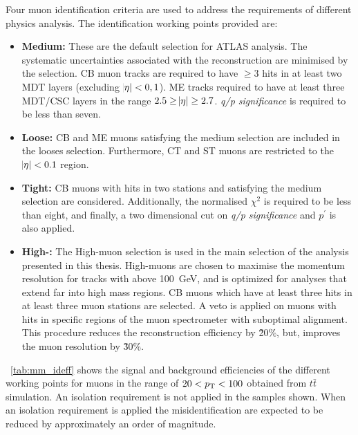 Four muon identification criteria are used to address the requirements of different physics analysis. The identification working points provided are: 
\begin{itemize}
    \item \textbf{Medium:} These are the default selection for ATLAS analysis. The systematic uncertainties associated with the reconstruction are minimised by the selection. CB muon tracks are required to have $\geq 3$ hits in at least two MDT layers (excluding $\abs{\eta} < 0,1$). ME tracks required to have at least three MDT/CSC layers in the range $2.5 \geq \abs{\eta} \geq 2.7$. \emph{q/p significance} is required to be less than seven.
    \item \textbf{Loose:} CB and ME muons satisfying the medium selection are included in the looses selection. Furthermore, CT and ST muons are restricted to the $\abs{\eta} < 0.1$ region. 
    \item \textbf{Tight:} CB muons with hits in two stations and satisfying the medium selection are considered. Additionally, the normalised $\chi^2$ is required to be less than eight, and finally, a two dimensional cut on \emph{q/p significance} and \emph{$p^\prime$} is also applied. 
    \item \textbf{High-\pt:} The High-\pt muon selection is used in the main selection of the analysis presented in this thesis. High-\pt muons are chosen to maximise the momentum resolution for tracks with \pt above \SI{100}{\giga\electronvolt}, and is optimized for analyses that extend far into high mass regions. CB muons which have at least three hits in at least three muon stations are selected. A veto is applied on muons with hits in specific regions of the muon spectrometer with suboptimal alignment. This procedure reduces the reconstruction efficiency by \~20\%, but, improves the muon \pt resolution by \~30\%.
\end{itemize}

~\cref{tab:mm_ideff} shows the signal and background efficiencies of the different working points for muons in the range of $20 < p_{\text{T}} < 100$ obtained from $t\bar{t}$ simulation. An isolation requirement is not applied in the samples shown. When an isolation requirement is applied the misidentification are expected to be reduced by approximately an order of magnitude. 

